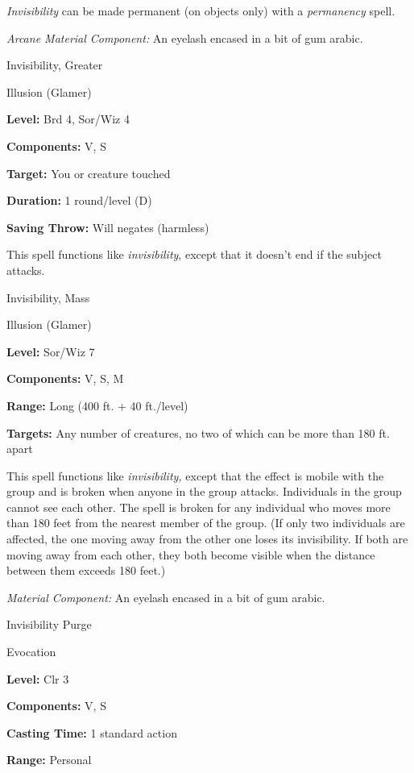 \documentclass{article}
\begin{document}
\textit{Invisibility }can be made permanent (on objects only) with a \textit{permanency 
}spell.

\textit{Arcane Material Component: }An eyelash encased in a bit of gum arabic.

\vspace{12pt}
Invisibility, Greater

Illusion (Glamer)

\textbf{Level:} Brd 4, Sor/Wiz 4

\textbf{Components:} V, S

\textbf{Target:} You or creature touched

\textbf{Duration:} 1 round/level (D)

\textbf{Saving Throw: }Will negates (harmless)

This spell functions like \textit{invisibility}, except that it doesn't end if 
the subject attacks.

\vspace{12pt}
Invisibility, Mass

Illusion (Glamer)

\textbf{Level:} Sor/Wiz 7

\textbf{Components:} V, S, M

\textbf{Range:} Long (400 ft. + 40 ft./level)

\textbf{Targets:} Any number of creatures, no two of which can be more than 180 
ft. apart

This spell functions like \textit{invisibility, }except that the effect is mobile 
with the group and is broken when anyone in the group attacks. Individuals in the 
group cannot see each other. The spell is broken for any individual who moves more 
than 180 feet from the nearest member of the group. (If only two individuals are 
affected, the one moving away from the other one loses its invisibility. If both 
are moving away from each other, they both become visible when the distance between 
them exceeds 180 feet.)

\textit{Material Component: }An eyelash encased in a bit of gum arabic.

\vspace{12pt}
Invisibility Purge

Evocation

\textbf{Level:} Clr 3

\textbf{Components:} V, S

\textbf{Casting Time:} 1 standard action

\textbf{Range:} Personal
\end{document}
